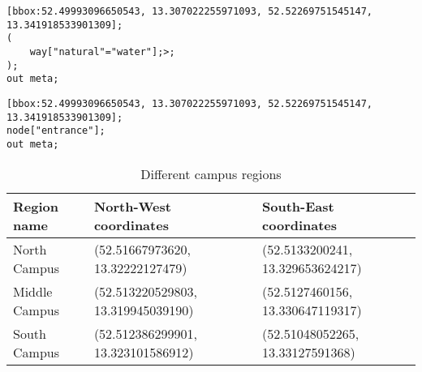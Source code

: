 \begin{lstlisting}[caption={Overpass Turbo query for water areas next to the campus}, label={water}]
[bbox:52.49993096650543, 13.307022255971093, 52.52269751545147, 13.341918533901309];
(
    way["natural"="water"];>;
);
out meta;
\end{lstlisting}

\begin{lstlisting}[caption={Overpass Turbo query for all entrances to buildings on the campus}, label={entrances}]
[bbox:52.49993096650543, 13.307022255971093, 52.52269751545147, 13.341918533901309];
node["entrance"];
out meta;
\end{lstlisting}

\begin{table}[H]
    \small
    \centering
    \begin{tabular}{|l|l|l|}
        \hline
        Region name              & North-West coordinates                           & South-East coordinates  \\
        \hline
        North Campus             & (52.51667973620, 13.32222127479)	              	& (52.5133200241, 13.329653624217)        \\
        \hline
        Middle Campus            & (52.513220529803, 13.319945039190)              	& (52.5127460156, 13.330647119317)         \\
        \hline
        South Campus             & (52.512386299901, 13.323101586912)              	& (52.51048052265, 13.33127591368)         \\
        \hline
    \end{tabular}
    \caption{Different campus regions}
    \label{table:campus_regions}
\end{table}
